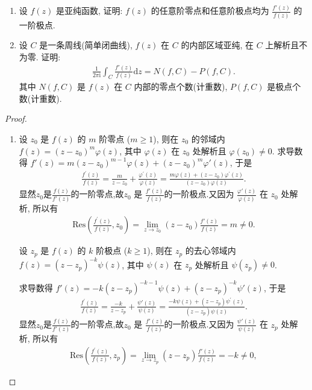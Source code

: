 \documentclass[../../main.tex]{subfiles}%
\begin{document}
\begin{example}
\begin{enumerate}[(1)]
\item 设 \(f(z)\) 是亚纯函数, 证明: \(f(z)\) 的任意阶零点和任意阶极点均为 \(\frac{f'(z)}{f(z)}\) 的一阶极点.

\item 设 \(C\) 是一条周线(简单闭曲线), \(f(z)\) 在 \(C\) 的内部区域亚纯, 在 \(C\) 上解析且不为零. 证明:
\begin{align*}
\frac{1}{2\pi \mathrm{i}} \int_C \frac{f'(z)}{f(z)} \mathrm{d}z = N(f, C) - P(f, C).
\end{align*}
其中 \(N(f, C)\) 是 \(f(z)\) 在 \(C\) 内部的零点个数(计重数), \(P(f, C)\) 是极点个数(计重数).
\end{enumerate}
\end{example}
\begin{proof}
\begin{enumerate}[(1)]
\item 设 \(z_0\) 是 \(f(z)\) 的 \(m\) 阶零点 (\(m \geqslant 1\)), 则在 \(z_0\) 的邻域内 \(f(z) = (z-z_0)^m \varphi(z)\), 其中 \(\varphi(z)\) 在 \(z_0\) 处解析且 \(\varphi(z_0) \neq 0\).
求导数得 \(f'(z) = m(z-z_0)^{m-1}\varphi(z) + (z-z_0)^m \varphi'(z)\), 于是
\begin{align*}
\frac{f^{\prime}\left( z \right)}{f\left( z \right)}=\frac{m}{z-z_0}+\frac{\varphi ^{\prime}\left( z \right)}{\varphi \left( z \right)}=\frac{m\varphi \left( z \right) +\left( z-z_0 \right) \varphi ^{\prime}\left( z \right)}{\left( z-z_0 \right) \varphi \left( z \right)}.
\end{align*}
显然$z_0$是$\frac{f(z)}{f'(z)}$的一阶零点,故\(z_0\) 是 \(\frac{f'(z)}{f(z)}\)的一阶极点.又因为 \(\frac{\varphi'(z)}{\varphi(z)}\) 在 \(z_0\) 处解析, 所以有
\begin{align*}
\mathrm{Res}\left( \frac{f^{\prime}\left( z \right)}{f\left( z \right)},z_0 \right) =\lim\limits_{z \to z_0} (z-z_0)\frac{f'(z)}{f(z)} = m \neq 0.
\end{align*}


设 \(z_p\) 是 \(f(z)\) 的 \(k\) 阶极点 (\(k \geqslant 1\)), 则在 \(z_p\) 的去心邻域内 \(f(z) = (z-z_p)^{-k} \psi(z)\), 其中 \(\psi(z)\) 在 \(z_p\) 处解析且 \(\psi(z_p) \neq 0\).

求导数得 \(f'(z) = -k(z-z_p)^{-k-1}\psi(z) + (z-z_p)^{-k} \psi'(z)\), 于是
\begin{align*}
\frac{f^{\prime}\left( z \right)}{f\left( z \right)}=\frac{-k}{z-z_p}+\frac{\psi' \left( z \right)}{\psi \left( z \right)}=\frac{-k\psi \left( z \right) +\left( z-z_p \right) \psi ^{\prime}\left( z \right)}{\left( z-z_p \right) \psi \left( z \right)}.
\end{align*}
显然$z_0$是$\frac{f(z)}{f'(z)}$的一阶零点,故\(z_0\) 是 \(\frac{f'(z)}{f(z)}\)的一阶极点.又因为 \(\frac{\psi'(z)}{\psi(z)}\) 在 \(z_p\) 处解析, 所以有
\begin{align*}
\mathrm{Res}\left( \frac{f^{\prime}\left( z \right)}{f\left( z \right)},z_p \right) =\lim\limits_{z \to z_p} (z-z_p)\frac{f'(z)}{f(z)} = -k \neq 0,
\end{align*}


\end{enumerate}
\end{proof}
\end{document}
